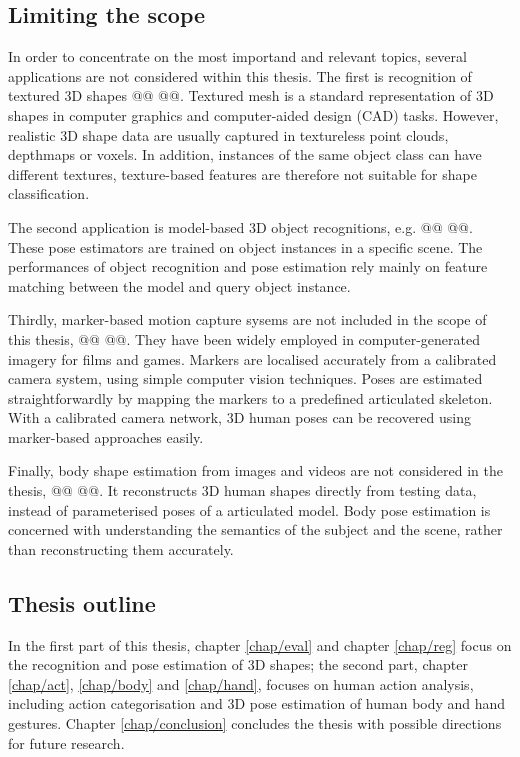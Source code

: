\subsection{Limiting the scope}

In order to concentrate on the most importand and relevant topics, 
several applications are not considered within this thesis. 
The first is recognition of textured 3D shapes @@ @@. Textured mesh is a standard representation of 3D shapes in computer graphics and computer-aided design (CAD) tasks. However, realistic 3D shape data are usually captured in textureless point clouds, depthmaps or voxels. In addition, instances of the same object class can have different textures, texture-based features are therefore not suitable for shape classification.      

The second application is model-based 3D object recognitions, e.g. @@ @@. These pose estimators are trained on object instances in a specific scene. The performances of object recognition and pose estimation rely mainly on feature matching between the model and query object instance. 

Thirdly, marker-based motion capture sysems are not included in the scope of this thesis, @@ @@. They have been widely employed in computer-generated imagery for films and games. Markers are localised accurately from a calibrated camera system, using simple computer vision techniques. Poses are estimated straightforwardly by mapping the markers to a predefined articulated skeleton.
 With a calibrated camera network, 3D human poses can be recovered using marker-based approaches easily.  

Finally, body shape estimation from images and videos are not considered in the thesis, @@ @@. It reconstructs 3D human shapes directly from testing data, instead of parameterised poses of a articulated model. Body pose estimation is concerned with understanding the semantics of the subject and the scene, rather than reconstructing them accurately. 

\subsection{Thesis outline}

In the first part of this thesis, chapter \ref{chap/eval} and chapter \ref{chap/reg} focus on the recognition and pose estimation of 3D shapes; the second part, chapter \ref{chap/act}, \ref{chap/body} and \ref{chap/hand}, focuses on human action analysis, including action categorisation and 3D pose estimation of human body and hand gestures. Chapter \ref{chap/conclusion} concludes the thesis with possible directions for future research. 

